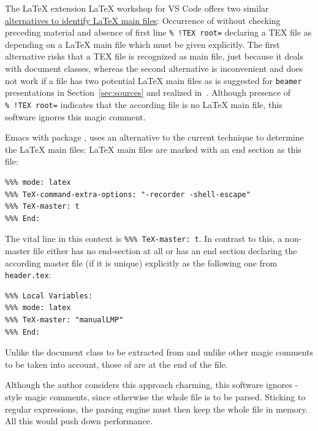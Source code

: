 


The \LaTeX{} extension \LaTeX{} workshop for VS Code offers two similar 
\href{https://github.com/James-Yu/LaTeX-Workshop/wiki/Compile#multi-file-projects}%
{alternatives to identify \LaTeX{} main files}: 
Occurrence of  without checking preceding material and 
absence of first line \texttt{\%~!TEX root=} declaring a TEX file 
as depending on a \LaTeX{} main file 
which must be given explicitly. 
The first alternative risks that a TEX file is recognized as main file, 
just because it deals with document classes, 
whereas the second alternative is inconvenient 
and does not work if a file has two potential \LaTeX{} main files 
as is suggested for \texttt{beamer} presentations in Section~\ref{sec:sources} 
and realized in~\cite{PresBeamer}. 
Although presence of \texttt{\%~!TEX root=} indicates that the according file 
is no \LaTeX{} main file, this software ignores this magic comment. 

Emacs with package \auctex, uses an alternative
to the current technique to determine the \LaTeX{} main files: 
\LaTeX{} main files are marked with an end section as this file: 
%
\begin{Verbatim}[fontsize=\footnotesize]
%%% Local Variables: 
%%% mode: latex
%%% TeX-command-extra-options: "-recorder -shell-escape" 
%%% TeX-master: t
%%% End: 
\end{Verbatim}
% 
The vital line in this context is \texttt{\%\%\% TeX-master: t}. 
In contrast to this, a non-master file 
either has no end-section at all or has an end section 
declaring the according master file (if it is unique) 
explicitly as the following one from \texttt{header.tex}: 
%
\begin{verbatim}
%%% Local Variables:
%%% mode: latex
%%% TeX-master: "manualLMP"
%%% End:
\end{verbatim}

Unlike the document class to be extracted from  
and unlike other magic comments to be taken into account, 
those of \auctex{} are at the end of the file. 

Although the author considers this approach charming, 
this software ignores \auctex-style magic comments, 
since otherwise the whole file is to be parsed. 
Sticking to regular expressions, 
the parsing engine must then keep the whole file in memory. 
All this would push down performance. 



